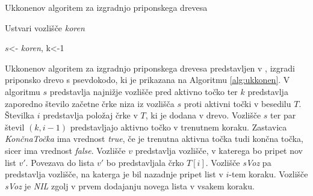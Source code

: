 \begin{algorithm}[htb]

    \caption{Ukkonenov algoritem za izgradnjo priponskega drevesa}\label{alg:ukkonen}
    {
        {Ustvari vozlišče \textit{koren}}
        
        {$s$<- \textit{koren}, k<-1}
        
        
    }
\end{algorithm}

Ukkonenov algoritem za izgradnjo priponskega drevesa predstavljen v \cite{Ukkonen1995}, izgradi priponsko drevo s psevdokodo, ki je prikazana na Algoritmu \ref{alg:ukkonen}.
V algoritmu $s$ predstavlja najnižje vozlišče pred aktivno točko ter $k$ predstavlja zaporedno število začetne črke niza iz vozlišča $s$ proti aktivni točki v besedilu $T$. Številka $i$ predstavlja položaj črke v $T$, ki je dodana v drevo. Vozlišče $s$ ter par števil $(k,i-1)$ predstavljajo aktivno točko v trenutnem koraku. Zastavica \textit{KončnaTočka} ima vrednost \textit{true}, če je trenutna aktivna točka tudi končna točka, sicer ima vrednost \textit{false}. Vozlišče $v$ predstavlja vozlišče, v katerega bo pripet nov list $v'$. Povezava do lista $v'$ bo predstavljala črko $T[i]$. Vozlišče \textit{sVoz} pa predstavlja vozlišče, na katerga je bil nazadnje pripet list v $i$-tem koraku. Vozlišče \textit{sVoz} je \textit{NIL} zgolj v prvem dodajanju novega lista v vsakem koraku.


